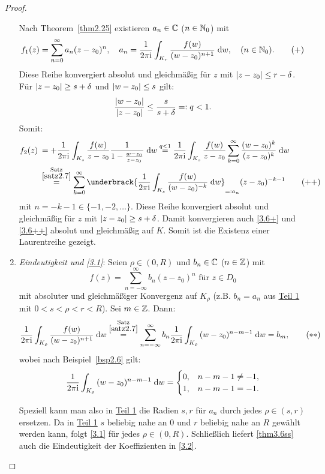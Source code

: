 \documentclass[a4paper,twoside,DIV15,BCOR12mm]{scrbook}
\begin{document}
\begin{proof}
\begin{enumerate}[label=\arabic*)]
Nach Theorem~\ref{thm2.25} existieren $a_n\in\mathbb{C}$ ($n\in\mathbb{N}_0$) mit
\[\label{3.6+}f_1(z)=\sum_{n=0}^{\infty}a_n(z-z_0)^n,\quad a_n=\frac{1}{2\pi\mathrm{i}}\int_{K_r}^{}{\frac{f(w)}{(w-z_0)^{n+1}}}\;\mathrm{d} w,\quad(n\in\mathbb{N}_0).\tag{$+$}\]
Diese Reihe konvergiert absolut und gleichmäßig für $z$ mit $\left\lvert z-z_0\right\lvert\leq r-\delta$. Für $\left\lvert z-z_0\right\lvert\geq s+\delta$ und $\left\lvert w-z_0\right\lvert\leq s$ gilt:
\[\frac{\left\lvert w-z_0\right\lvert}{\left\lvert z-z_0\right\lvert}\leq\frac{s}{s+\delta}=: q < 1.\]
Somit:
\begin{align*}\label{3.6++}
f_2(z)\: &= +\frac{1}{2\pi\i}\integral{K_s}{}{\frac{f(w)}{z-z_0}\frac{1}{1-\frac{w-z_0}{z-z_0}}}{w} \overset{q<1}{=} \frac{1}{2\pi\i}\integral{K_s}{}{\frac{f(w)}{z-z_0}\sum_{k=0}^{\infty}\frac{(w-z_0)^k}{(z-z_0)^k}}{w}\\
&\overset{\substack{\text{Satz}\\\ref{satz2.7}}}{=} \sum_{k=0}^{\infty}\underbrack{\frac{1}{2\pi\i}\integral{K_s}{}{\frac{f(w)}{(w-z_0)^{-k}}}{w}}_{\ad a_n}(z-z_0)^{-k-1}\tag{$++$}
\end{align*}
mit $n=-k-1\in\{-1,-2,\dotsc\}$. Diese Reihe konvergiert absolut und gleichmäßig für $z$ mit $\left\lvert z-z_0\right\lvert\geq s+\delta$. Damit konvergieren auch \eqref{3.6+} und \eqref{3.6++} absolut und gleichmäßig auf $K$. Somit ist die Existenz einer Laurentreihe gezeigt.

\item \textit{Eindeutigkeit und \eqref{3.1}}: Seien $\rho\in(0,R)$ und $b_n\in\mathbb{C}$ ($n\in\mathbb{Z}$) mit
\[f(z)=\sum_{n=-\infty}^{\infty}b_n(z-z_0)^n\text{ für }z\in D_0\]
mit absoluter und gleichmäßiger Konvergenz auf $K_\rho$ (z.B. $b_n=a_n$ aus \hyperref[thm3.6:1]{Teil 1} mit $0<s<\rho<r<R$). Sei $m\in\mathbb{Z}$. Dann:
\[\label{thm3.6ss}\frac{1}{2\pi\mathrm{i}}\int_{K_\rho}^{}{\frac{f(w)}{(w-z_0)^{n+1}}}\;\mathrm{d} w \overset{\substack{\text{Satz}\\\ref{satz2.7}}}{=} \sum_{n=-\infty}^{\infty}b_n \frac{1}{2\pi\mathrm{i}}\int_{K_\rho}^{}{(w-z_0)^{n-m-1}}\;\mathrm{d} w=b_m,\tag{$**$}\]
wobei nach Beispiel~\ref{bsp2.6} gilt:
\[\frac{1}{2\pi\mathrm{i}}\int_{K_\rho}^{}{(w-z_0)^{n-m-1}}\;\mathrm{d} w=\begin{cases}0,&n-m-1\neq -1,\\1,&n-m-1=-1.\end{cases}\]

Speziell kann man also in \hyperref[thm3.6:1]{Teil 1} die Radien $s,r$ für $a_n$ durch jedes $\rho\in(s,r)$ ersetzen. Da in \hyperref[thm3.6:1]{Teil 1} $s$ beliebig nahe an 0 und $r$ beliebig nahe an $R$ gewählt werden kann, folgt \eqref{3.1} für jedes $\rho\in(0,R)$. Schließlich liefert \eqref{thm3.6ss} auch die Eindeutigkeit der Koeffizienten in \eqref{3.2}.\qedhere
\end{enumerate}
\end{proof}
\end{document}
